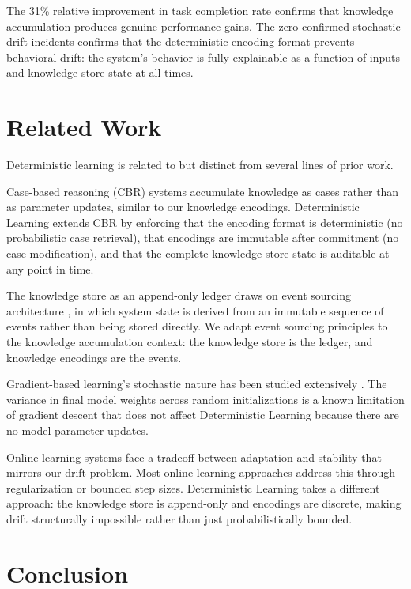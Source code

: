 \documentclass[12pt]{article}
\begin{document}
The 31\% relative improvement in task completion rate confirms that knowledge accumulation produces genuine performance gains. The zero confirmed stochastic drift incidents confirms that the deterministic encoding format prevents behavioral drift: the system's behavior is fully explainable as a function of inputs and knowledge store state at all times.

\section{Related Work}
\label{sec:related}

Deterministic learning is related to but distinct from several lines of prior work.

Case-based reasoning (CBR) systems \cite{kolodner1993} accumulate knowledge as cases rather than as parameter updates, similar to our knowledge encodings. Deterministic Learning extends CBR by enforcing that the encoding format is deterministic (no probabilistic case retrieval), that encodings are immutable after commitment (no case modification), and that the complete knowledge store state is auditable at any point in time.

The knowledge store as an append-only ledger draws on event sourcing architecture \cite{event-sourcing}, in which system state is derived from an immutable sequence of events rather than being stored directly. We adapt event sourcing principles to the knowledge accumulation context: the knowledge store is the ledger, and knowledge encodings are the events.

Gradient-based learning's stochastic nature has been studied extensively \cite{goodfellow2016deep}. The variance in final model weights across random initializations is a known limitation of gradient descent that does not affect Deterministic Learning because there are no model parameter updates.

Online learning systems \cite{shalev2012online} face a tradeoff between adaptation and stability that mirrors our drift problem. Most online learning approaches address this through regularization or bounded step sizes. Deterministic Learning takes a different approach: the knowledge store is append-only and encodings are discrete, making drift structurally impossible rather than just probabilistically bounded.

\section{Conclusion}
\label{sec:conclusion}
\end{document}
